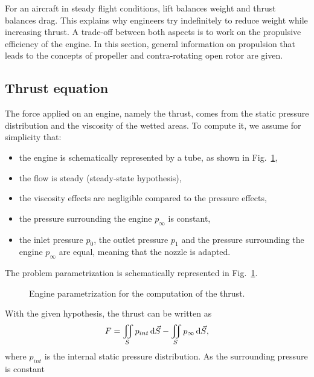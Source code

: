 
For an aircraft in steady flight conditions, 
lift balances weight and 
thrust balances drag. This explains why engineers try
indefinitely to reduce weight while increasing
thrust. A trade-off between both aspects is to work
on the propulsive efficiency of the engine. In this
section, general information on propulsion
that leads to the concepts of propeller and
contra-rotating open rotor are given.

\subsection{Thrust equation}
\label{sub:cror_thrust}

The force applied on an engine, namely the thrust,
comes from the static pressure
distribution and the viscosity of the wetted areas.
To compute it, we assume for simplicity that:
 \begin{itemize} \itemsep0pt \parskip0pt
  \item the engine is schematically represented by a tube,
  as shown in Fig.~\ref{fig:engine_parametrization},
  \item the flow is steady (steady-state hypothesis),
  \item the viscosity effects are negligible compared
  to the pressure effects,
  \item the pressure surrounding the engine $p_\infty$
  is constant,
  \item the inlet pressure $p_0$, the outlet pressure
  $p_1$ and the pressure surrounding the engine $p_\infty$ are equal,
  meaning that the nozzle is adapted.
\end{itemize}
The problem parametrization is schematically represented
in Fig.~\ref{fig:engine_parametrization}.
\begin{figure}[htp]
  \centering
  \quad{}
  \caption{Engine parametrization for the computation of the thrust.}
  \label{fig:engine_parametrization}
\end{figure}
With the given hypothesis, the thrust can be written as
\begin{equation}
	F = \iint_{S} p_{int} \diff \vec{S} - 
	    \iint_{S} p_{\infty} \diff \vec{S},
	\label{eq:thrust_1}
\end{equation}
where $p_{int}$ is the internal static
pressure distribution.
As the surrounding pressure is constant
